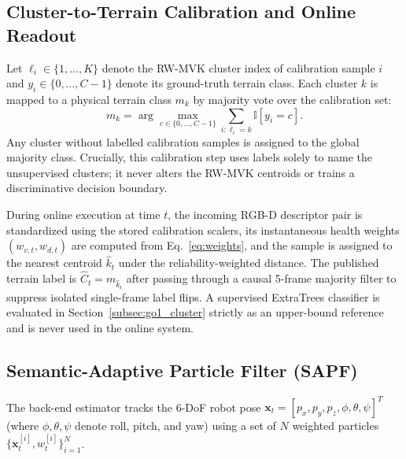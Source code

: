 \documentclass[11pt, a4paper]{article}
\begin{document}
\subsection{Cluster-to-Terrain Calibration and Online Readout}
\label{subsec:readout}
Let $\ell_i \in \{1,\dots,K\}$ denote the RW-MVK cluster index of calibration sample $i$ and $y_i \in \{0,\dots,C-1\}$ denote its ground-truth terrain class. Each cluster $k$ is mapped to a physical terrain class $m_k$ by majority vote over the calibration set:
\begin{equation}
m_k = \arg\max_{c\in\{0,\dots,C-1\}}
\sum_{i:\ell_i=k}\mathbb{I}[y_i=c].
\label{eq:mapping}
\end{equation}
Any cluster without labelled calibration samples is assigned to the global majority class. Crucially, this calibration step uses labels solely to name the unsupervised clusters; it never alters the RW-MVK centroids or trains a discriminative decision boundary.

During online execution at time $t$, the incoming RGB-D descriptor pair is standardized using the stored calibration scalers, its instantaneous health weights $(w_{v,t}, w_{d,t})$ are computed from Eq.~\eqref{eq:weights}, and the sample is assigned to the nearest centroid $\hat{k}_t$ under the reliability-weighted distance. The published terrain label is $\hat{C}_t = m_{\hat{k}_t}$ after passing through a causal 5-frame majority filter to suppress isolated single-frame label flips. A supervised ExtraTrees classifier is evaluated in Section~\ref{subsec:go1_cluster} strictly as an upper-bound reference and is never used in the online system.

\subsection{Semantic-Adaptive Particle Filter (SAPF)}
\label{subsec:sapf}
The back-end estimator tracks the 6-DoF robot pose $\mathbf{x}_t = [p_x,p_y,p_z,\phi,\theta,\psi]^T$ (where $\phi,\theta,\psi$ denote roll, pitch, and yaw) using a set of $N$ weighted particles $\{\mathbf{x}^{[i]}_t,w^{[i]}_t\}_{i=1}^{N}$.
\end{document}
